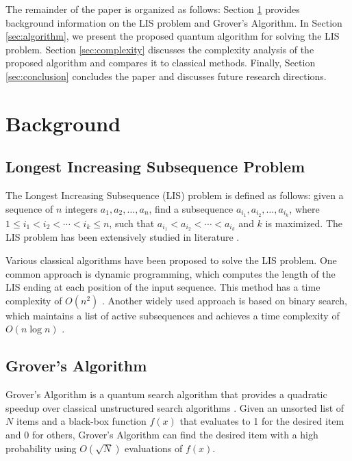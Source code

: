 The remainder of the paper is organized as follows: Section \ref{sec:background} provides background information on the LIS problem and Grover's Algorithm. In Section \ref{sec:algorithm}, we present the proposed quantum algorithm for solving the LIS problem. Section \ref{sec:complexity} discusses the complexity analysis of the proposed algorithm and compares it to classical methods. Finally, Section \ref{sec:conclusion} concludes the paper and discusses future research directions.

\section{Background}
\label{sec:background}

\subsection{Longest Increasing Subsequence Problem}

The Longest Increasing Subsequence (LIS) problem is defined as follows: given a sequence of $n$ integers $a_1, a_2, \ldots, a_n$, find a subsequence $a_{i_1}, a_{i_2}, \ldots, a_{i_k}$, where $1 \leq i_1 < i_2 < \cdots < i_k \leq n$, such that $a_{i_1} < a_{i_2} < \cdots < a_{i_k}$ and $k$ is maximized. The LIS problem has been extensively studied in literature \cite{fredman1976good,skiena1997algorithm}.

Various classical algorithms have been proposed to solve the LIS problem. One common approach is dynamic programming, which computes the length of the LIS ending at each position of the input sequence. This method has a time complexity of $O(n^2)$ \cite{skiena1997algorithm}. Another widely used approach is based on binary search, which maintains a list of active subsequences and achieves a time complexity of $O(n\log{n})$ \cite{fredman1976good}.

\subsection{Grover's Algorithm}

Grover's Algorithm is a quantum search algorithm that provides a quadratic speedup over classical unstructured search algorithms \cite{grover1996fast}. Given an unsorted list of $N$ items and a black-box function $f(x)$ that evaluates to 1 for the desired item and 0 for others, Grover's Algorithm can find the desired item with a high probability using $O(\sqrt{N})$ evaluations of $f(x)$.

